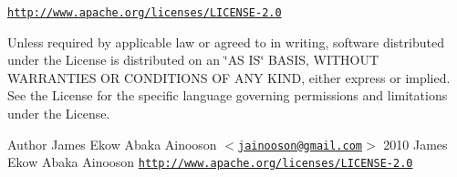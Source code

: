 \href{http://www.apache.org/licenses/LICENSE-2.0}{\tt http://www.apache.org/licenses/LICENSE-\/2.0}

Unless required by applicable law or agreed to in writing, software distributed under the License is distributed on an \char`\"{}AS IS\char`\"{} BASIS, WITHOUT WARRANTIES OR CONDITIONS OF ANY KIND, either express or implied. See the License for the specific language governing permissions and limitations under the License.

\begin{DoxyAuthor}{Author}
James Ekow Abaka Ainooson $<$\href{mailto:jainooson@gmail.com}{\tt jainooson@gmail.com}$>$  2010 James Ekow Abaka Ainooson  \href{http://www.apache.org/licenses/LICENSE-2.0}{\tt http://www.apache.org/licenses/LICENSE-\/2.0} 
\end{DoxyAuthor}
